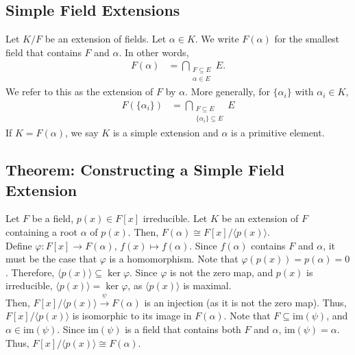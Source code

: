 \documentclass[10pt]{extarticle}
\begin{document}
  \subsection{Simple Field Extensions}%
  Let $K/F$ be an extension of fields. Let $\alpha \in K$. We write $F(\alpha)$ for the smallest field that contains $F$ and $\alpha$. In other words,
  \begin{align*}
    F(\alpha) &= \bigcap_{\substack{F\subseteq E\\ \alpha\in E}} E.
  \end{align*}
  We refer to this as the extension of $F$ by $\alpha$. More generally, for $\{\alpha_i\}$ with $\alpha_i\in K$,
  \begin{align*}
    F(\{\alpha_i\}) &= \bigcap_{\substack{F\subseteq E\\\{\alpha_i\}\subseteq E}}E
  \end{align*}
  If $K = F(\alpha)$, we say $K$ is a simple extension and $\alpha$ is a primitive element.
  \subsection{Theorem: Constructing a Simple Field Extension}%
  Let $F$ be a field, $p(x) \in F[x]$ irreducible. Let $K$ be an extension of $F$ containing a root $\alpha$ of $p(x)$. Then, $F(\alpha) \cong F[x]/\langle p(x)\rangle$.\\

  Define $\varphi: F[x]\rightarrow F(\alpha)$, $f(x)\mapsto f(\alpha)$. Since $f(\alpha)$ contains $F$ and $\alpha$, it must be the case that $\varphi$ is a homomorphism. Note that $\varphi(p(x)) = p(\alpha) = 0$. Therefore, $\langle p(x)\rangle\subseteq \ker\varphi$. Since $\varphi$ is not the zero map, and $p(x)$ is irreducible, $\langle p(x)\rangle = \ker\varphi$, as $\langle p(x)\rangle$ is maximal.\\

  Then, $F[x]/\langle p(x)\rangle \xrightarrow{\psi} F(\alpha)$ is an injection (as it is not the zero map). Thus, $F[x]/\langle p(x)\rangle$ is isomorphic to its image in $F(\alpha)$. Note that $F\subseteq \text{im}(\psi)$, and $\alpha \in \text{im}(\psi)$. Since $\text{im}(\psi)$ is a field that contains both $F$ and $\alpha$, $\text{im}(\psi) = \alpha$. Thus, $F[x]/\langle p(x)\rangle \cong F(\alpha)$.
\end{document}
